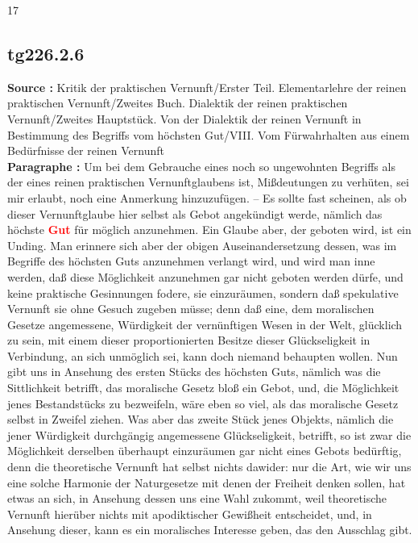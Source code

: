 \documentclass[a4paper,12pt,twoside]{book}
\newcommand{\match}[1]{\textcolor{red}{\textbf{#1}}}
\begin{document}
	
	17
	
	
	
	\subsection*{tg226.2.6} 
	\textbf{Source : }Kritik der praktischen Vernunft/Erster Teil. Elementarlehre der reinen praktischen Vernunft/Zweites Buch. Dialektik der reinen praktischen Vernunft/Zweites Hauptstück. Von der Dialektik der reinen Vernunft in Bestimmung des Begriffs vom höchsten Gut/VIII. Vom Fürwahrhalten aus einem Bedürfnisse der reinen Vernunft\\  
	
	\noindent\textbf{Paragraphe : }Um bei dem Gebrauche eines noch so ungewohnten Begriffs als der eines reinen praktischen Vernunftglaubens ist, Mißdeutungen zu verhüten, sei mir erlaubt, noch eine Anmerkung hinzuzufügen. – Es sollte fast scheinen, als ob dieser Vernunftglaube hier selbst als Gebot angekündigt werde, nämlich das höchste \match{Gut} für möglich anzunehmen. Ein Glaube aber, der geboten wird, ist ein Unding. Man erinnere sich aber der obigen Auseinandersetzung dessen, was im Begriffe des höchsten Guts anzunehmen verlangt wird, und wird man inne werden, daß diese Möglichkeit anzunehmen gar nicht geboten werden dürfe, und keine praktische Gesinnungen fodere, sie einzuräumen, sondern daß spekulative Vernunft sie ohne Gesuch zugeben müsse; denn daß eine, dem moralischen Gesetze angemessene, Würdigkeit der vernünftigen Wesen in der Welt, glücklich zu sein, mit einem dieser proportionierten Besitze dieser Glückseligkeit in Verbindung, an sich unmöglich sei, kann doch niemand behaupten wollen. Nun gibt uns in Ansehung des ersten Stücks des höchsten Guts, nämlich was die Sittlichkeit betrifft, das moralische Gesetz bloß ein Gebot, und, die Möglichkeit jenes Bestandstücks zu bezweifeln, wäre eben so viel, als das moralische Gesetz selbst in Zweifel ziehen. Was aber das zweite Stück jenes Objekts, nämlich die jener Würdigkeit durchgängig angemessene Glückseligkeit, betrifft, so ist zwar die Möglichkeit derselben überhaupt einzuräumen gar nicht eines Gebots bedürftig, denn die theoretische Vernunft hat selbst nichts dawider: nur die Art, wie wir uns eine solche Harmonie der Naturgesetze mit denen der Freiheit denken sollen, hat etwas an sich, in Ansehung dessen uns eine Wahl zukommt, weil theoretische Vernunft hierüber nichts mit apodiktischer Gewißheit entscheidet, und, in Ansehung dieser, kann es ein moralisches Interesse geben, das den Ausschlag gibt. 
	
\end{document}
